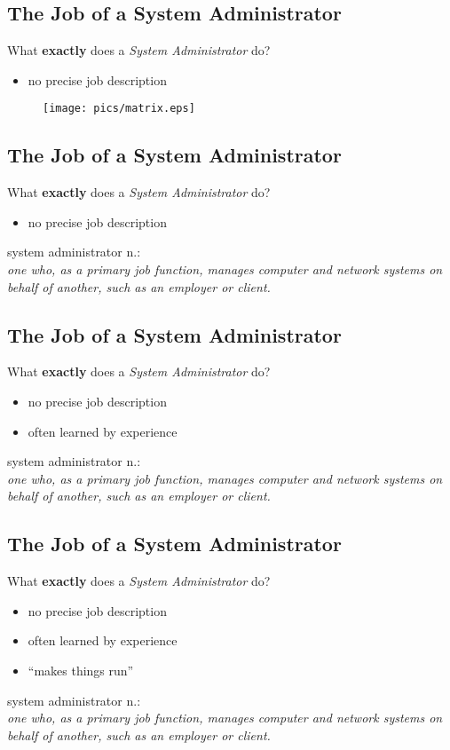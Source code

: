 \documentclass[xga]{xdvislides}
\begin{document}
\subsection{The Job of a System Administrator}
What {\bf exactly} does a {\em System Administrator} do?
\begin{itemize}
	\item no precise job description
\end{itemize}
\begin{figure}[hb]
	\begin{center}
		\texttt{[image: pics/matrix.eps]} \\
	\end{center}
\end{figure}



\subsection{The Job of a System Administrator}
What {\bf exactly} does a {\em System Administrator} do?
\begin{itemize}
	\item no precise job description
\end{itemize}
\vfill
 system administrator n.: \\
{\em one who, as a primary job function,
	manages computer and network systems on behalf of another, such as an
	employer or client.}

\subsection{The Job of a System Administrator}
What {\bf exactly} does a {\em System Administrator} do?
\begin{itemize}
	\item no precise job description
	\item often learned by experience
\end{itemize}
\vfill
system administrator n.: \\
{\em one who, as a primary job function,
	manages computer and network systems on behalf of another, such as an
	employer or client.}

\subsection{The Job of a System Administrator}
What {\bf exactly} does a {\em System Administrator} do?
\begin{itemize}
	\item no precise job description
	\item often learned by experience
	\item ``makes things run''
\end{itemize}
\vfill
system administrator n.: \\
{\em one who, as a primary job function,
	manages computer and network systems on behalf of another, such as an
	employer or client.}
\end{document}
